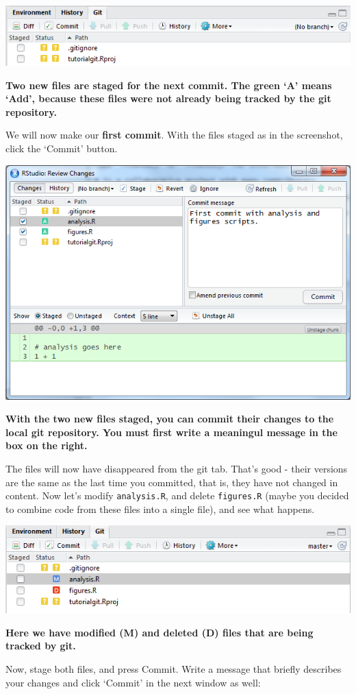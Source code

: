 \documentclass[]{book}
\begin{document}
\includegraphics[width=0.75\linewidth]{screenshots/gittabnewproject}

\textbf{Two new files are staged for the next commit. The green `A' means `Add', because these files were not already being tracked by the git repository.}

We will now make our \textbf{first commit}. With the files staged as in the screenshot, click the `Commit' button.

\includegraphics[width=0.75\linewidth]{screenshots/gitfirstcommit}

\textbf{With the two new files staged, you can commit their changes to the local git repository. You must first write a meaningul message in the box on the right.}

The files will now have disappeared from the git tab. That's good - their versions are the same as the last time you committed, that is, they have not changed in content. Now let's modify \texttt{analysis.R}, and delete \texttt{figures.R} (maybe you decided to combine code from these files into a single file), and see what happens.

\includegraphics[width=0.75\linewidth]{screenshots/gitsecondcommit}

\textbf{Here we have modified (M) and deleted (D) files that are being tracked by git.}

Now, stage both files, and press Commit. Write a message that briefly describes your changes and click `Commit' in the next window as well:
\end{document}
